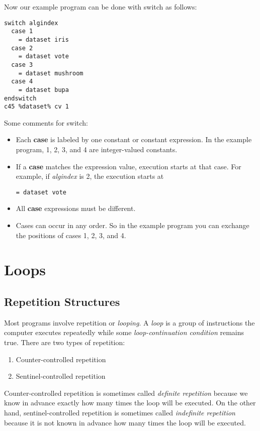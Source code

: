 \documentclass[a4paper,12pt]{book}
\begin{document}
Now our example program can be done with switch as follows:\\
\begin{verbatim}
switch algindex 
  case 1
    = dataset iris
  case 2 
    = dataset vote
  case 3
    = dataset mushroom 
  case 4
    = dataset bupa
endswitch
c45 %dataset% cv 1
\end{verbatim}
Some comments for switch:
\begin{itemize}
\item Each {\bf case} is labeled by one constant or constant expression. In the example program, 1, 2, 3, and 4 are integer-valued constants.
\item If a {\bf case} matches the expression value, execution starts at that case. For example, if \textsl{algindex} is 2, the execution starts at
\begin{verbatim}
= dataset vote
\end{verbatim}
\item All {\bf case} expressions must be different. 
\item Cases can occur in any order. So in the example program you can exchange the positions of cases 1, 2, 3, and 4. 
\end{itemize}

\section{Loops}

\subsection{Repetition Structures}
Most programs involve repetition or {\em looping}. A {\em loop} is a group of instructions the computer executes repeatedly while
some {\em loop-continuation condition} remains true. There are two types of repetition:
\begin{enumerate}
\item Counter-controlled repetition
\item Sentinel-controlled repetition
\end{enumerate}

Counter-controlled repetition is sometimes called {\em definite repetition} because we know in advance exactly how many times the loop will be executed. On the other hand, sentinel-controlled repetition is sometimes called {\em indefinite repetition} because it is not known in advance how many times the loop will be executed.
\end{document}
